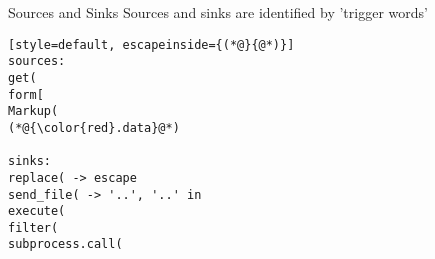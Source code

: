 \begin{frame}[fragile]{Sources and Sinks}
  Sources and sinks are identified by 'trigger words'
  \begin{lstlisting}[style=default, escapeinside={(*@}{@*)}]
sources:
get(
form[
Markup(
(*@{\color{red}.data}@*)

sinks:
replace( -> escape
send_file( -> '..', '..' in
execute(
filter(
subprocess.call(
\end{lstlisting}

\end{frame}
